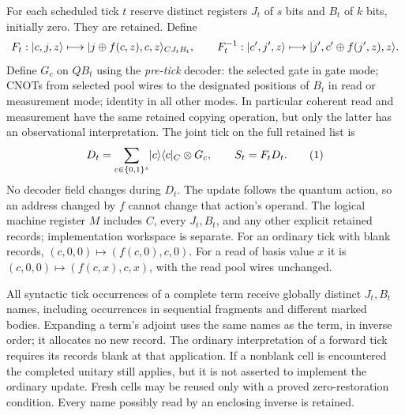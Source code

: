 \begin{definition}\label{def:joint-tick}
For each scheduled tick $t$ reserve distinct registers $J_t$ of $s$ bits
and $B_t$ of $k$ bits, initially zero. They are retained. Define
\[
 F_t:\lvert c,j,z\rangle\longmapsto
       \lvert j\oplus f(c,z),c,z\rangle_{C J_t B_t},\qquad
 F_t^{-1}:\lvert c',j',z\rangle\longmapsto
       \lvert j',c'\oplus f(j',z),z\rangle.
\]
Define $G_c$ on $QB_t$ using the \emph{pre-tick} decoder: the selected
gate in gate mode; CNOTs from selected pool wires to the designated
positions of $B_t$ in read or measurement mode; identity in all other
modes. In particular coherent read and measurement have the same retained
copying operation, but only the latter has an observational interpretation.
The joint tick on the full retained list is
\[
 D_t=\sum_{c\in\{0,1\}^s}\lvert c\rangle\langle c\rvert_C\otimes G_c,
 \qquad S_t=F_tD_t.                         \tag{1}\label{eq:tick}
\]
No decoder field changes during $D_t$. The update follows the quantum
action, so an address changed by $f$ cannot change that action's operand.
The logical machine register $M$ includes $C$, every $J_t,B_t$, and any
other explicit retained records; implementation workspace is separate.
For an ordinary tick with blank records,
$(c,0,0)\mapsto(f(c,0),c,0)$. For a read of basis value $x$ it is
$(c,0,0)\mapsto(f(c,x),c,x)$, with the read pool wires unchanged.

All syntactic tick occurrences of a complete term receive globally
distinct $J_t,B_t$ names, including occurrences in sequential fragments
and different marked bodies. Expanding a term's adjoint uses the same
names as the term, in inverse order; it allocates no new record.
The ordinary interpretation of a forward tick requires its records blank
at that application. If a nonblank cell is encountered the completed
unitary still applies, but it is not asserted to implement the ordinary
update. Fresh cells may be reused only with a proved zero-restoration
condition. Every name possibly read by an enclosing inverse is retained.
\end{definition}

